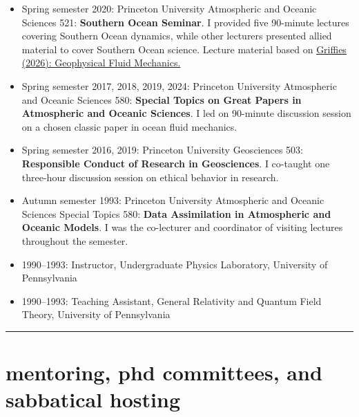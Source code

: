 \documentclass{article}
\begin{document}
\begin{itemize}[leftmargin=*]
\item Spring semester 2020: Princeton University Atmospheric and Oceanic Sciences 521: {\bf Southern Ocean Seminar}. I provided five 90-minute lectures covering Southern Ocean dynamics, while other lecturers presented allied material to cover Southern Ocean science.  Lecture material based on \href{https://stephengriffies.github.io/assets/pdfs/GFM_lectures.pdf}{Griffies (2026): Geophysical Fluid Mechanics.} 

\item Spring semester 2017, 2018, 2019, 2024: Princeton University Atmospheric and Oceanic Sciences 580: {\bf Special Topics on Great Papers in Atmospheric and Oceanic Sciences}. I led on 90-minute discussion session on a chosen classic paper in ocean fluid mechanics. 

\item Spring semester 2016, 2019: Princeton University Geosciences 503: {\bf Responsible Conduct of Research in Geosciences}.  I co-taught one three-hour discussion session on ethical behavior in research. 

\item Autumn semester 1993: Princeton University Atmospheric and Oceanic Sciences Special Topics 580: {\bf Data Assimilation in Atmospheric and Oceanic Models}. I was the co-lecturer and coordinator of visiting lectures throughout the semester. 

\item 1990--1993:  Instructor, Undergraduate Physics Laboratory, University of Pennsylvania 

\item 1990--1993:  Teaching Assistant,  General Relativity and Quantum Field Theory, University of Pennsylvania 

\end{itemize}



\noindent\rule{\textwidth}{1pt}
\vspace{-.5cm}
\section*{\sc  \color{Maroon} mentoring, phd committees, and sabbatical hosting}
\vspace{-.25cm}
\end{document}
